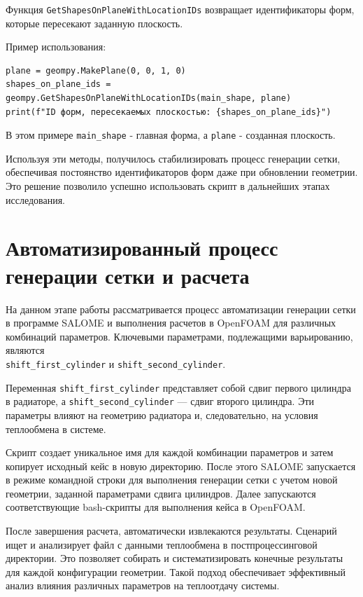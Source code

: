 \documentclass[a4paper,12pt]{article}
\theoremstyle{plain} %
\theoremstyle{definition} %
\theoremstyle{remark} %
\begin{document}
Функция \texttt{GetShapesOnPlaneWithLocationIDs} возвращает идентификаторы форм, которые пересекают заданную плоскость.

Пример использования:
\begin{verbatim}
plane = geompy.MakePlane(0, 0, 1, 0)
shapes_on_plane_ids = geompy.GetShapesOnPlaneWithLocationIDs(main_shape, plane)
print(f"ID форм, пересекаемых плоскостью: {shapes_on_plane_ids}")
\end{verbatim}

В этом примере \texttt{main\_shape} - главная форма, а \texttt{plane} - созданная плоскость.

Используя эти методы, получилось стабилизировать процесс генерации сетки, обеспечивая постоянство идентификаторов форм даже при обновлении геометрии. Это решение позволило успешно использовать скрипт в дальнейших этапах исследования.

\section{Автоматизированный процесс генерации сетки и расчета}

На данном этапе работы рассматривается процесс автоматизации генерации сетки в программе SALOME и выполнения расчетов в OpenFOAM для различных комбинаций параметров. Ключевыми параметрами, подлежащими варьированию, являются \\ \texttt{shift\_first\_cylinder} и \texttt{shift\_second\_cylinder}.

Переменная \texttt{shift\_first\_cylinder} представляет собой сдвиг первого цилиндра в радиаторе, а \texttt{shift\_second\_cylinder} — сдвиг второго цилиндра. Эти параметры влияют на геометрию радиатора и, следовательно, на условия теплообмена в системе.

Скрипт создает уникальное имя для каждой комбинации параметров и затем копирует исходный кейс в новую директорию. После этого SALOME запускается в режиме командной строки для выполнения генерации сетки с учетом новой геометрии, заданной параметрами сдвига цилиндров. Далее запускаются соответствующие bash-скрипты для выполнения кейса в OpenFOAM.

После завершения расчета, автоматически извлекаются результаты. Сценарий ищет и анализирует файл с данными теплообмена в постпроцессинговой директории. Это позволяет собирать и систематизировать конечные результаты для каждой конфигурации геометрии. Такой подход обеспечивает эффективный анализ влияния различных параметров на теплоотдачу системы.
\end{document}

